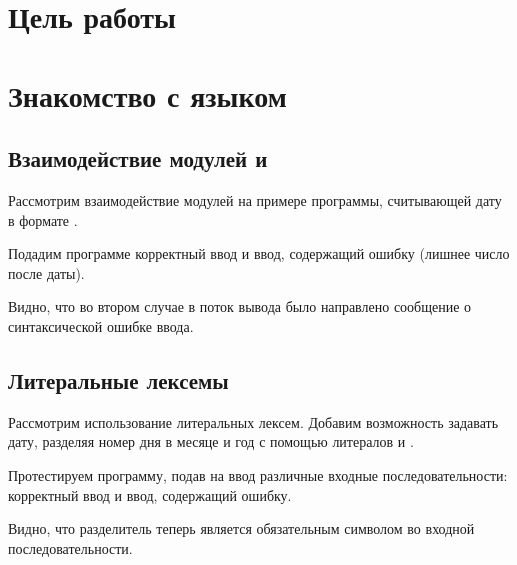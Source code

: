 





\tableofcontents
\newpage

\section{Цель работы}

\section{Знакомство с языком }

\subsection{Взаимодействие модулей  и }

Рассмотрим взаимодействие модулей на примере программы, считывающей дату в формате .



Подадим программе корректный ввод и ввод, содержащий ошибку (лишнее число после даты).



Видно, что во втором случае в поток вывода было направлено сообщение о синтаксической ошибке ввода.

\subsection{Литеральные лексемы}

Рассмотрим использование литеральных лексем. Добавим возможность задавать дату, разделяя номер дня в месяце и год с помощью литералов  и . 



Протестируем программу, подав на ввод различные входные последовательности: корректный ввод и ввод, содержащий ошибку.




Видно, что разделитель теперь является обязательным символом во входной последовательности.


